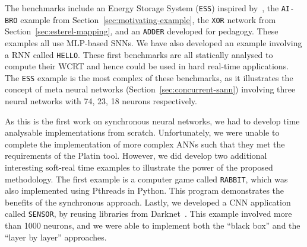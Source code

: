 The benchmarks include an Energy
Storage System (\texttt{ESS}) inspired by~\cite{chaudhari2017hybrid},
the \texttt{AI-BRO} example from Section~\ref{sec:motivating-example}, the \texttt{XOR} network from Section~\ref{sec:esterel-mapping}, and an \texttt{ADDER} developed for
pedagogy. These examples all use \ac{MLP}-based
\acp{SNN}. We have also developed an example involving a \ac{RNN}
called \texttt{HELLO}. 
These first benchmarks are all statically analysed to
compute their \ac{WCRT} and hence could be used in hard real-time
applications. The \texttt{ESS} example is the most complex of these
benchmarks, as it illustrates the concept of meta neural networks
(Section~\ref{sec:concurrent-sann}) involving three neural networks
with 74, 23, 18 neurons respectively.

As this is the first work on synchronous neural networks, we had to
develop time analysable implementations from scratch. Unfortunately, we were unable
to complete the implementation of more complex \acp{ANN} such that they met the requirements of the Platin tool. 
However, we did develop two additional interesting soft-real time examples to illustrate the power of the proposed methodology. The
first example is a computer game called \texttt{RABBIT}, which was
also implemented using Pthreads in Python.
This program demonstrates the
benefits of the synchronous approach. 
Lastly, we developed a \ac{CNN} application called \texttt{SENSOR}, by reusing
libraries from Darknet~\cite{redmon2015real}. This example involved more than 1000 neurons, and we
were able to implement both the ``black box'' and the ``layer by layer'' approaches.





